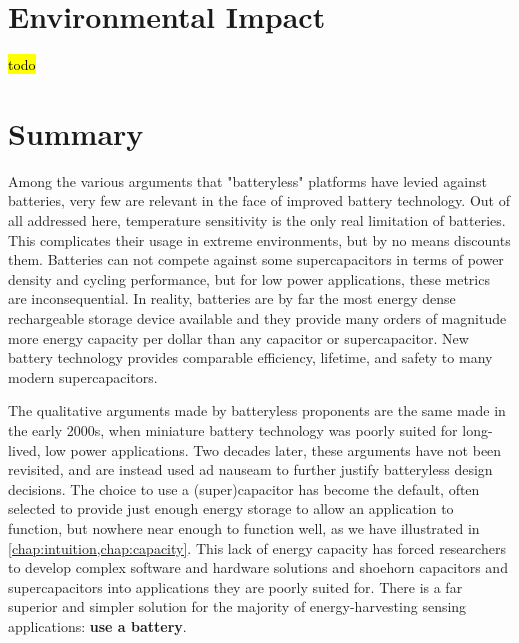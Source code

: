 \section{Environmental Impact}
\hl{todo}

\section{Summary}
Among the various arguments that "batteryless" platforms have levied against batteries, very few are relevant in the face of improved battery technology. Out of all addressed here, temperature sensitivity is the only real limitation of batteries. This complicates their usage in extreme environments, but by no means discounts them. Batteries can not compete against some supercapacitors in terms of power density and cycling performance, but for low power applications, these metrics are inconsequential. 
In reality, batteries are by far the most energy dense rechargeable storage device available and they provide many orders of magnitude more energy capacity per dollar than any capacitor or supercapacitor. New battery technology provides comparable efficiency, lifetime, and safety to many modern supercapacitors. 

The qualitative arguments made by batteryless proponents are the same made in the early 2000s, when miniature battery technology was poorly suited for long-lived, low power applications. Two decades later, these arguments have not been revisited, and are instead used ad nauseam to further justify batteryless design decisions.
The choice to use a (super)capacitor has become the default, often selected to provide just enough energy storage to allow an application to function, but nowhere near enough to function well, as we have illustrated in \cref{chap:intuition,chap:capacity}. This lack of energy capacity has forced researchers to develop complex software and hardware solutions and shoehorn capacitors and supercapacitors into applications they are poorly suited for. There is a far superior and simpler solution for the majority of energy-harvesting sensing applications: \textbf{use a battery}.

